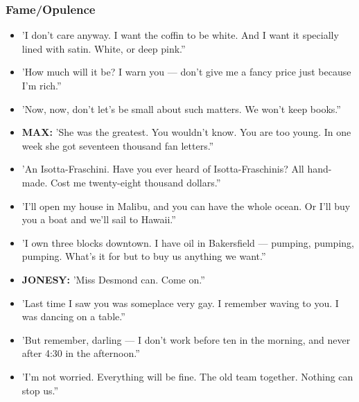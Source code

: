 \documentclass[a4paper]{article}
\begin{document}
\subsubsection{Fame/Opulence}
\begin{itemize}
\item 'I don't care anyway. I want the coffin to be white. And I want it specially lined with satin. White, or deep pink.”
\item 'How much will it be? I warn you — don't give me a fancy price just because I'm rich.”
\item 'Now, now, don't let's be small about such matters. We won't keep books.”
\item \textbf{MAX:} 'She was the greatest. You wouldn't know. You are too young. In one week she got seventeen thousand fan letters.”
\item 'An Isotta-Fraschini. Have you ever heard of Isotta-Fraschinis? All hand-made. Cost me twenty-eight thousand dollars.”
\item 'I'll open my house in Malibu, and you can have the whole ocean. Or I'll buy you a boat and we'll sail to Hawaii.”
\item 'I own three blocks downtown. I have oil in Bakersfield — pumping, pumping, pumping. What's it for but to buy us anything we want.”
\item \textbf{JONESY:} 'Miss Desmond can. Come on.”
\item 'Last time I saw you was someplace very gay. I remember waving to you. I was dancing on a table.”
\item 'But remember, darling — I don't work before ten in the morning, and never after 4:30 in the afternoon.”
\item 'I'm not worried. Everything will be fine. The old team together. Nothing can stop us.”
\end{itemize}
\end{document}
